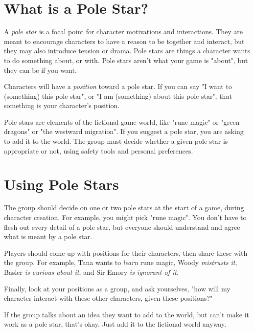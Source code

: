 \documentclass[10pt,oneside,letterpaper,landscape]{memoir}
\begin{document}
\begin{multicols}{3}
\vspace{2mm}

\section{What is a Pole Star?}

A \textit{pole star} is a focal point for character motivations and interactions. They are meant to encourage characters to have a reason to be together and interact, but they may also introduce tension or drama. Pole stars are things a character wants to do something about, or with. Pole stars aren't what your game is "about", but they can be if you want.

Characters will have a \textit{position} toward a pole star. If you can say "I want to (something) this pole star", or "I am (something) about this pole star", that something is your character's position.

Pole stars are elements of the fictional game world, like "rune magic" or "green dragons" or "the westward migration". If you suggest a pole star, you are asking to add it to the world. The group must decide whether a given pole star is appropriate or not, using safety tools and personal preferences.

\section{Using Pole Stars}

The group should decide on one or two pole stars at the start of a game, during character creation. For example, you might pick "rune magic". You don't have to flesh out every detail of a pole star, but everyone should understand and agree what is meant by a pole star.

Players should come up with positions for their characters, then share these with the group. For example, Tana wants to \textit{learn} rune magic, Woody \textit{mistrusts it}, Basler \textit{is curious about it}, and Sir Emory \textit{is ignorant of it}.

Finally, look at your positions as a group, and ask yourselves, "how will my character interact with these other characters, given these positions?"

If the group talks about an idea they want to add to the world, but can't make it work as a pole star, that's okay. Just add it to the fictional world anyway.

\vfill\null %


\end{multicols}
\end{document}
